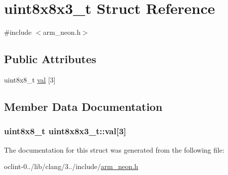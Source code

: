 \hypertarget{structuint8x8x3__t}{\section{uint8x8x3\-\_\-t Struct Reference}
\label{structuint8x8x3__t}
}


{\ttfamily \#include $<$arm\-\_\-neon.\-h$>$}

\subsection*{Public Attributes}
\begin{DoxyCompactItemize}
\item 
uint8x8\-\_\-t \hyperlink{structuint8x8x3__t_aacba6e6a70f36f292dcf2a88bff9d632}{val} \mbox{[}3\mbox{]}
\end{DoxyCompactItemize}


\subsection{Member Data Documentation}
\hypertarget{structuint8x8x3__t_aacba6e6a70f36f292dcf2a88bff9d632}{
\subsubsection[{val}]{\setlength{\rightskip}{0pt plus 5cm}uint8x8\-\_\-t uint8x8x3\-\_\-t\-::val\mbox{[}3\mbox{]}}}\label{structuint8x8x3__t_aacba6e6a70f36f292dcf2a88bff9d632}


The documentation for this struct was generated from the following file\-:\begin{DoxyCompactItemize}
\item 
oclint-\/0../lib/clang/3../include/\hyperlink{arm__neon_8h}{arm\-\_\-neon.\-h}\end{DoxyCompactItemize}
